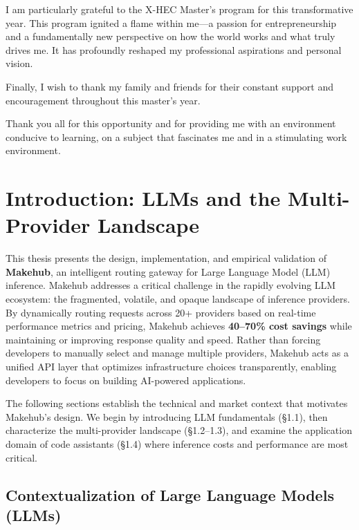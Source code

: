 \documentclass[english]{article}
\begin{document}
I am particularly grateful to the X-HEC Master's program for this transformative year. This program ignited a flame within me—a passion for entrepreneurship and a fundamentally new perspective on how the world works and what truly drives me. It has profoundly reshaped my professional aspirations and personal vision.

Finally, I wish to thank my family and friends for their constant support and encouragement throughout this master's year.

\bigskip

Thank you all for this opportunity and for providing me with an environment conducive to learning, on a subject that fascinates me and in a stimulating work environment.

\newpage
\tableofcontents
\newpage
\listoffigures

\newpage

\section{Introduction: LLMs and the Multi-Provider Landscape}

This thesis presents the design, implementation, and empirical validation of \textbf{Makehub}, an intelligent routing gateway for Large Language Model (LLM) inference. Makehub addresses a critical challenge in the rapidly evolving LLM ecosystem: the fragmented, volatile, and opaque landscape of inference providers. By dynamically routing requests across 20+ providers based on real-time performance metrics and pricing, Makehub achieves \textbf{40--70\% cost savings} while maintaining or improving response quality and speed. Rather than forcing developers to manually select and manage multiple providers, Makehub acts as a unified API layer that optimizes infrastructure choices transparently, enabling developers to focus on building AI-powered applications.

The following sections establish the technical and market context that motivates Makehub's design. We begin by introducing LLM fundamentals (§1.1), then characterize the multi-provider landscape (§1.2--1.3), and examine the application domain of code assistants (§1.4) where inference costs and performance are most critical.

\subsection{Contextualization of Large Language Models (LLMs)}
\end{document}
